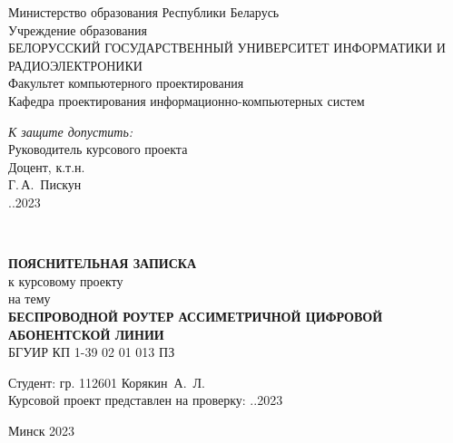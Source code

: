 

\begin{titlepage}
\begin{center}
Министерство образования Республики Беларусь\\[1.2em]
Учреждение образования\\[0.4em]
БЕЛОРУССКИЙ ГОСУДАРСТВЕННЫЙ УНИВЕРСИТЕТ ИНФОРМАТИКИ И РАДИОЭЛЕКТРОНИКИ\\[2.0em]
Факультет компьютерного проектирования\\
Кафедра проектирования информационно-компьютерных систем

\end{center}

\begin{flushright}
  \begin{minipage}{0.5\textwidth}
    \textit{К защите допустить:}\\
    Руководитель курсового проекта\\
    Доцент, к.т.н.\\
    \underline{\hspace*{2.8cm}} Г.\,А.~Пискун\\
    \underline{\hspace*{1.4cm}}.\underline{\hspace*{1.4cm}}.2023
  \end{minipage}\\[2em]
\end{flushright}

\begin{center}
  \textbf{ПОЯСНИТЕЛЬНАЯ ЗАПИСКА}\\
  к курсовому проекту\\
  на тему\\[2.0em]

  \textbf{БЕСПРОВОДНОЙ РОУТЕР АССИМЕТРИЧНОЙ ЦИФРОВОЙ АБОНЕНТСКОЙ ЛИНИИ}\\
  БГУИР КП 1-39 02 01 013 ПЗ
\end{center}

\begin{flushright}
    \begin{minipage}{9.3cm}
        Студент:  гр. 112601 Корякин~А.~Л.\\[0.1em]

        Курсовой проект представлен на проверку: \underline{\hspace*{1.4cm}}.\underline{\hspace*{1.4cm}}.2023\\
        \underline{\hspace*{5.6cm}}
        
    \end{minipage}
  \end{flushright}
  
  \vfill
  \begin{center}
    {\normalsize Минск 2023}
    \end{center}
\end{titlepage}
